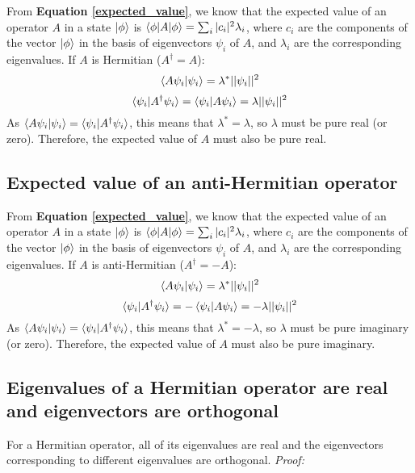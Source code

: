 From \textbf{Equation \ref{expected_value}}, we know that the expected value of an operator $A$ in a state $\ket{\phi}$ is $\braket{\phi|A|\phi} = \sum_i|c_i|^2\lambda_i$, where $c_i$ are the components of the vector $\ket{\phi}$ in the basis of eigenvectors $\psi_i$ of $A$, and $\lambda_i$ are the corresponding eigenvalues. If $A$ is Hermitian ($A^\dagger = A$):
\begin{equation}
    \braket{A\psi_i|\psi_i} = \lambda^*||\psi_i||^2
\end{equation}
\begin{equation}
    \braket{\psi_i|A^\dagger\psi_i} = \braket{\psi_i|A\psi_i} = \lambda||\psi_i||^2
\end{equation} 
As $\braket{A\psi_i|\psi_i} = \braket{\psi_i|A^\dagger \psi_i}$, this means that $\lambda^* = \lambda$, so $\lambda$ must be pure real (or zero). Therefore, the expected value of $A$ must also be pure real.

\subsection{Expected value of an anti-Hermitian operator} \label{expected_value_anti_hermitian}

From \textbf{Equation \ref{expected_value}}, we know that the expected value of an operator $A$ in a state $\ket{\phi}$ is $\braket{\phi|A|\phi} = \sum_i|c_i|^2\lambda_i$, where $c_i$ are the components of the vector $\ket{\phi}$ in the basis of eigenvectors $\psi_i$ of $A$, and $\lambda_i$ are the corresponding eigenvalues. If $A$ is anti-Hermitian ($A^\dagger = -A$):
\begin{equation}
    \braket{A\psi_i|\psi_i} = \lambda^*||\psi_i||^2
\end{equation}
\begin{equation}
    \braket{\psi_i|A^\dagger\psi_i} = -\braket{\psi_i|A\psi_i} = -\lambda||\psi_i||^2
\end{equation} 
As $\braket{A\psi_i|\psi_i} = \braket{\psi_i|A^\dagger \psi_i}$, this means that $\lambda^* = -\lambda$, so $\lambda$ must be pure imaginary (or zero). Therefore, the expected value of $A$ must also be pure imaginary.

\subsection{Eigenvalues of a Hermitian operator are real and eigenvectors are orthogonal} \label{eigenvalues_real_orthogonal}

For a Hermitian operator, all of its eigenvalues are real and the eigenvectors corresponding to different eigenvalues are orthogonal. \textit{Proof:}

